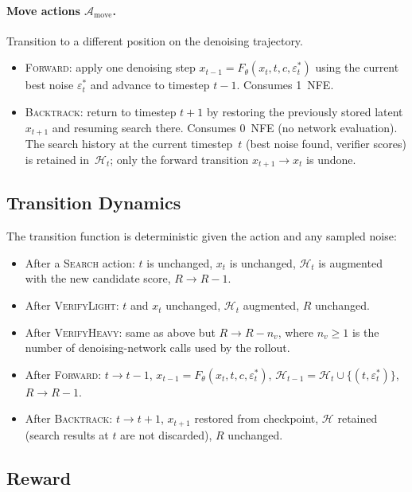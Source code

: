 \paragraph{Move actions $\mathcal{A}_{\text{move}}$.}
Transition to a different position on the denoising trajectory.
\begin{itemize}
  \item \textsc{Forward}: apply one denoising step
    $x_{t-1} = F_\theta(x_t, t, c, \varepsilon_t^*)$ using the current
    best noise $\varepsilon_t^*$ and advance to timestep $t-1$.
    Consumes 1~NFE.
  \item \textsc{Backtrack}: return to timestep $t+1$ by restoring the
    previously stored latent $x_{t+1}$ and resuming search there.
    Consumes 0~NFE (no network evaluation).
    The search history at the current timestep~$t$ (best noise found,
    verifier scores) is retained in~$\mathcal{H}_t$; only the
    forward transition $x_{t+1}\!\to\!x_t$ is undone.
\end{itemize}

\subsection{Transition Dynamics}

The transition function is deterministic given the action and any
sampled noise:
\begin{itemize}
  \item After a \textsc{Search} action: $t$ is unchanged,
    $x_t$ is unchanged, $\mathcal{H}_t$ is augmented with the new
    candidate score, $R \to R - 1$.
  \item After \textsc{VerifyLight}: $t$ and $x_t$ unchanged,
    $\mathcal{H}_t$ augmented, $R$ unchanged.
  \item After \textsc{VerifyHeavy}: same as above but
    $R \to R - n_v$, where $n_v \ge 1$ is the number of
    denoising-network calls used by the rollout.
  \item After \textsc{Forward}: $t \to t-1$,
    $x_{t-1} = F_\theta(x_t, t, c, \varepsilon_t^*)$,
    $\mathcal{H}_{t-1} = \mathcal{H}_t \cup \{(t, \varepsilon_t^*)\}$,
    $R \to R - 1$.
  \item After \textsc{Backtrack}: $t \to t+1$, $x_{t+1}$ restored from
    checkpoint, $\mathcal{H}$ retained (search results at $t$ are
    not discarded), $R$ unchanged.
\end{itemize}

\subsection{Reward}

